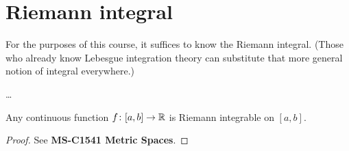 \section{Riemann integral}

For the purposes of this course, it suffices to know the Riemann
integral. (Those who already know Lebesgue integration theory can
substitute that more general notion of integral everywhere.)

\begin{definition}
  \label{def:riemann_integral}
  \ldots
\end{definition}

\begin{lemma}
  \label{lem:continuous_implies_riemann_integrable}
  Any continuous function $f \colon [a,b] \to \mathbb{R}$ is Riemann
  integrable on $[a,b]$.
\end{lemma}
\begin{proof}
  See \textbf{MS-C1541 Metric Spaces}.
\end{proof}
